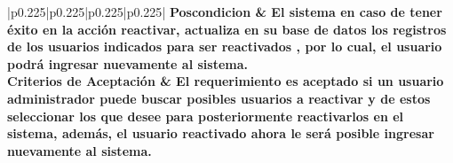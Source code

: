 \begin{center}
\begin{longtable}{|p{}|p{}|p{}|p{}|}
\hline
\bf Poscondicion &
{El sistema en caso de tener éxito en la acción reactivar, actualiza en su base de datos los registros de los usuarios indicados para ser reactivados , por lo cual, el usuario podrá ingresar nuevamente al sistema. } \\
\hline
\bf Criterios de Aceptación &
{El requerimiento es aceptado si un usuario administrador puede buscar posibles usuarios a reactivar y de estos seleccionar los que desee para posteriormente reactivarlos en el sistema, además, el usuario reactivado ahora le será posible ingresar nuevamente al sistema. } \\
\hline
\end{longtable}
\end{center}
%